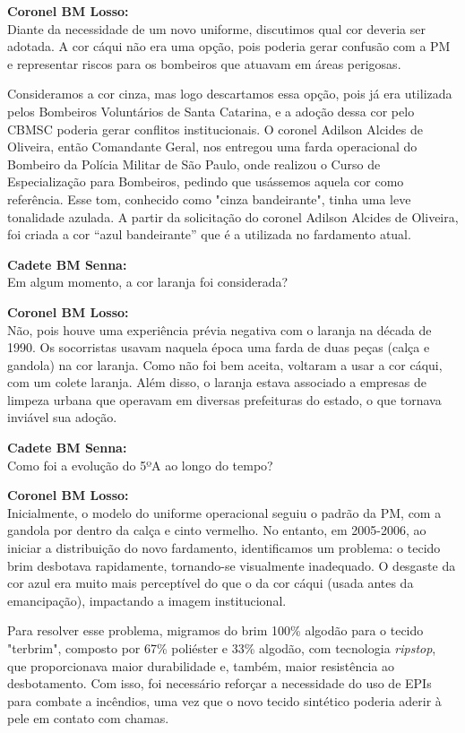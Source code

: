 \noindent \textbf{Coronel BM Losso:} \\ Diante da necessidade de um novo uniforme, discutimos qual cor deveria ser adotada. A cor cáqui não era uma opção, pois poderia gerar confusão com a PM e representar riscos para os bombeiros que atuavam em áreas perigosas. 

\noindent Consideramos a cor cinza, mas logo descartamos essa opção, pois já era utilizada pelos Bombeiros Voluntários de Santa Catarina, e a adoção dessa cor pelo CBMSC poderia gerar conflitos institucionais. O coronel Adilson Alcides de Oliveira, então Comandante Geral, nos entregou uma farda operacional do Bombeiro da Polícia Militar de São Paulo, onde realizou o Curso de Especialização para Bombeiros, pedindo que usássemos aquela cor como referência. Esse tom, conhecido como "cinza bandeirante", tinha uma leve tonalidade azulada. A partir da solicitação do coronel Adilson Alcides de Oliveira, foi criada a cor “azul bandeirante” que é a utilizada no fardamento atual.

\noindent \textbf{Cadete BM Senna:} \\ Em algum momento, a cor laranja foi considerada?

\noindent \textbf{Coronel BM Losso:} \\ Não, pois houve uma experiência prévia negativa com o laranja 
na década de 1990. Os socorristas usavam naquela época uma farda de duas peças (calça e gandola) 
na cor laranja. Como não foi bem aceita, voltaram a usar a cor cáqui, com um colete laranja.
 Além disso, o laranja estava associado a empresas de limpeza urbana que operavam em diversas prefeituras
  do estado, o que tornava inviável sua adoção.

\noindent \textbf{Cadete BM Senna:} \\ Como foi a evolução do 5ºA ao longo do tempo?

\noindent \textbf{Coronel BM Losso:} \\ Inicialmente, o modelo do uniforme operacional seguiu o padrão da
 PM, com a gandola por dentro da calça e cinto vermelho. No entanto, em 2005-2006, ao iniciar a 
 distribuição do novo fardamento, identificamos um problema: o tecido brim desbotava rapidamente, tornando-se
  visualmente inadequado. O desgaste da cor azul era muito mais perceptível do que o da cor cáqui
   (usada antes da emancipação), impactando a imagem institucional.

\noindent Para resolver esse problema, migramos do brim 100\% algodão para o tecido "terbrim", composto por 67\% poliéster e 33\% algodão, com tecnologia \textit{ripstop}, que proporcionava maior durabilidade e, também, maior resistência ao desbotamento. Com isso, foi necessário reforçar a necessidade do uso de EPIs para combate a incêndios, uma vez que o novo tecido sintético poderia aderir à pele em contato com chamas.

